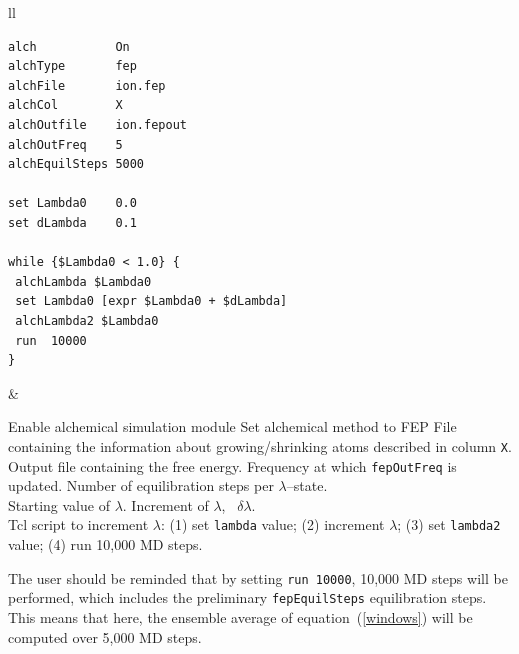 \begin{tabular}{ll}
\begin{minipage}{8cm}
\begin{verbatim}
alch           On
alchType       fep
alchFile       ion.fep
alchCol        X
alchOutfile    ion.fepout
alchOutFreq    5
alchEquilSteps 5000

set Lambda0    0.0
set dLambda    0.1

while {$Lambda0 < 1.0} {
 alchLambda $Lambda0
 set Lambda0 [expr $Lambda0 + $dLambda]
 alchLambda2 $Lambda0
 run  10000
}
\end{verbatim}
\end{minipage}
&
\begin{minipage}{7.8cm}
Enable alchemical simulation module
\newline
Set alchemical method to FEP
\newline
File containing the information about growing/shrinking atoms
described in column {\tt X}.
\newline
Output file containing the free energy.
\newline
Frequency at which {\tt fepOutFreq} is updated.
\newline
Number of equilibration steps per $\lambda$--state.
\\[0.6cm]
Starting value of $\lambda$.
\newline
Increment of $\lambda$, \ie~$\delta \lambda$.
\\[0.6cm]
{\sc Tcl} script to increment $\lambda$:
\newline
\hspace{0.4cm} (1) set {\tt lambda} value;
\newline
\hspace{0.4cm} (2) increment $\lambda$;
\newline
\hspace{0.4cm} (3) set {\tt lambda2} value;
\newline
\hspace{0.4cm} (4) run 10,000 MD steps.
\\
\end{minipage}
\end{tabular}


The user should be reminded that by setting {\tt run  10000},
10,000 MD steps will be performed, which includes the
preliminary {\tt fepEquilSteps} equilibration steps.
This means that here, the ensemble average of equation~({\ref{windows}})
will be computed  over 5,000 MD steps.


